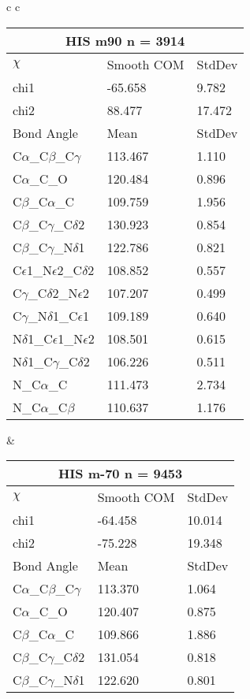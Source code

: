 \begin{longtable}{ c c }
  \begin{tabular}{ l l l }
  \toprule
  \multicolumn{3}{c}{HIS \textbf{m90} n = 3914} \\ \toprule
  $\chi$       & Smooth COM & StdDev \\ \midrule
  chi1 & -65.658 & 9.782 \\ 
  chi2 & 88.477 & 17.472 \\ \midrule
  Bond Angle   & Mean     & StdDev \\ \midrule
  C$\alpha$\_C$\beta$\_C$\gamma$ & 113.467 & 1.110\\
  C$\alpha$\_C\_O & 120.484 & 0.896\\
  C$\beta$\_C$\alpha$\_C & 109.759 & 1.956\\
  C$\beta$\_C$\gamma$\_C$\delta$2 & 130.923 & 0.854\\
  C$\beta$\_C$\gamma$\_N$\delta$1 & 122.786 & 0.821\\
  C$\epsilon$1\_N$\epsilon$2\_C$\delta$2 & 108.852 & 0.557\\
  C$\gamma$\_C$\delta$2\_N$\epsilon$2 & 107.207 & 0.499\\
  C$\gamma$\_N$\delta$1\_C$\epsilon$1 & 109.189 & 0.640\\
  N$\delta$1\_C$\epsilon$1\_N$\epsilon$2 & 108.501 & 0.615\\
  N$\delta$1\_C$\gamma$\_C$\delta$2 & 106.226 & 0.511\\
  N\_C$\alpha$\_C & 111.473 & 2.734\\
  N\_C$\alpha$\_C$\beta$ & 110.637 & 1.176\\
  \bottomrule
  \end{tabular}
  &
  \begin{tabular}{ l l l }
  \toprule
  \multicolumn{3}{c}{HIS \textbf{m-70} n = 9453} \\ \toprule
  $\chi$       & Smooth COM & StdDev \\ \midrule
  chi1 & -64.458 & 10.014 \\ 
  chi2 & -75.228 & 19.348 \\ \midrule
  Bond Angle   & Mean     & StdDev \\ \midrule
  C$\alpha$\_C$\beta$\_C$\gamma$ & 113.370 & 1.064\\
  C$\alpha$\_C\_O & 120.407 & 0.875\\
  C$\beta$\_C$\alpha$\_C & 109.866 & 1.886\\
  C$\beta$\_C$\gamma$\_C$\delta$2 & 131.054 & 0.818\\
  C$\beta$\_C$\gamma$\_N$\delta$1 & 122.620 & 0.801\\

\end{tabular}
\end{longtable}

